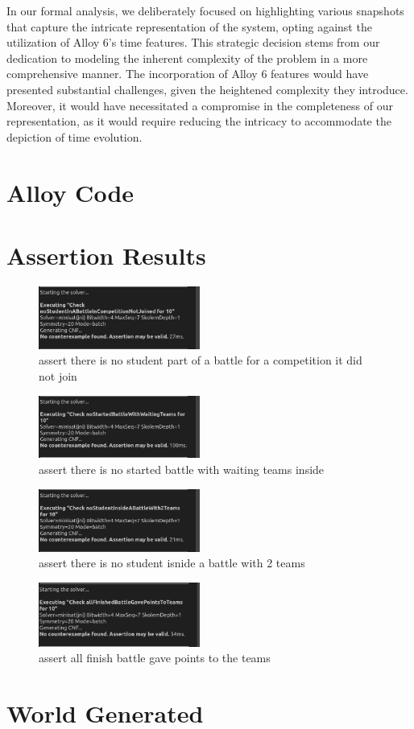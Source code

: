 In our formal analysis, we deliberately focused on highlighting various snapshots that capture the intricate representation of the system, opting against the utilization of Alloy 6's time features. This strategic decision stems from our dedication to modeling the inherent complexity of the problem in a more comprehensive manner. The incorporation of Alloy 6 features would have presented substantial challenges, given the heightened complexity they introduce. Moreover, it would have necessitated a compromise in the completeness of our representation, as it would require reducing the intricacy to accommodate the depiction of time evolution.

\section{Alloy Code}


\section{Assertion Results}

\begin{figure}[H]
    \centering
    \includegraphics[width=200px]{Images/alloy/assert_1.png}
    \caption{assert there is no student part of a battle for a competition it did not join}
\end{figure}

\begin{figure}[H]
    \centering
    \includegraphics[width=200px]{Images/alloy/assert_2.png}
    \caption{assert there is no started battle with waiting teams inside}
\end{figure}

\begin{figure}[H]
    \centering
    \includegraphics[width=200px]{Images/alloy/assert_3.png}
    \caption{assert there is no student isnide a battle with 2 teams}
\end{figure}


\begin{figure}[H]
    \centering
    \includegraphics[width=200px]{Images/alloy/assert_4.png}
    \caption{assert all finish battle gave points to the teams}
\end{figure}

\section{World Generated}
